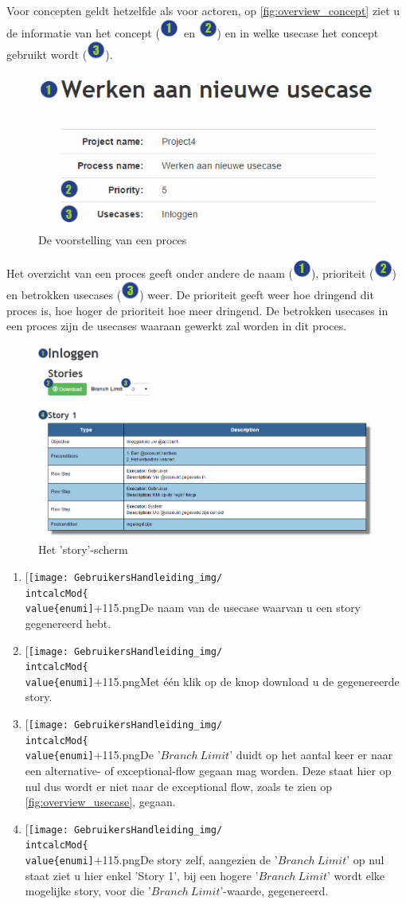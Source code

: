 \documentclass[a4paper,11pt]{article}
\newcommand{\one}{\includegraphics[scale=0.5]{Gebruikershandleiding_img/1.png}}
\newcommand{\two}{\includegraphics[scale=0.5]{Gebruikershandleiding_img/2.png}}
\newcommand{\three}{\includegraphics[scale=0.5]{Gebruikershandleiding_img/3.png}}
\newcommand*{\myitem}{
 \item[{\texttt{[image: GebruikersHandleiding\_img/\\intcalcMod\{\\value\{enumi]}+1}{15}.png}}]\stepcounter{enumi}
\begin{document}
Voor concepten geldt hetzelfde als voor actoren, op \autoref{fig:overview_concept} ziet u de informatie van het concept (\one\ en \two) en in welke usecase het concept gebruikt wordt (\three).\\

\begin{figure}[H]
\centering
\includegraphics[scale=0.5]{Gebruikershandleiding_img/show_process.png}
\caption{De voorstelling van een proces}
\label{fig:overview_process}
\end{figure}

Het overzicht van een proces geeft onder andere de naam (\one), prioriteit (\two) en betrokken usecases (\three) weer. De prioriteit geeft weer hoe dringend dit proces is, hoe hoger de prioriteit hoe meer dringend. De betrokken usecases in een proces zijn de usecases waaraan gewerkt zal worden in dit proces.

\begin{figure}[H]
\centering
\includegraphics[scale=0.5]{Gebruikershandleiding_img/story.png}
\caption{Het 'story'-scherm}
\label{fig:story}
\end{figure}

\begin{enumerate}
\myitem De naam van de usecase waarvan u een story gegenereerd hebt.
\myitem Met \'e\'en klik op de knop download u de gegenereerde story.
\myitem De '$Branch\ Limit$' duidt op het aantal keer er naar een alternative- of exceptional-flow gegaan mag worden. Deze staat hier op nul dus wordt er niet naar de exceptional flow, zoals te zien op \autoref{fig:overview_usecase}, gegaan.
\myitem De story zelf, aangezien de '$Branch\ Limit$' op nul staat ziet u hier enkel 'Story 1', bij een hogere '$Branch\ Limit$' wordt elke mogelijke story, voor die '$Branch\ Limit$'-waarde, gegenereerd.
\end{enumerate}
\end{document}
